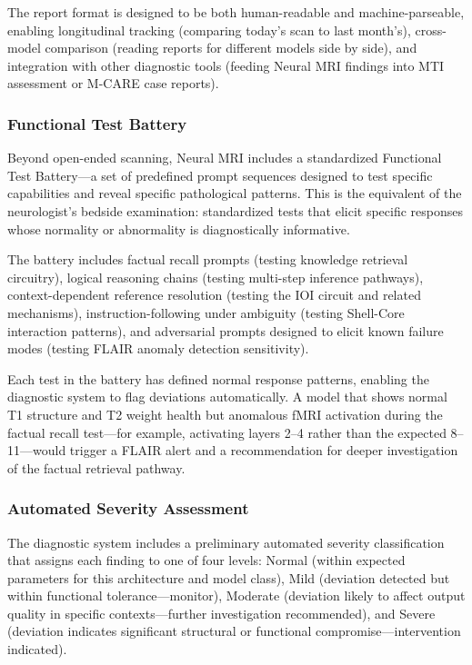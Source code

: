 \documentclass[11pt]{article}
\begin{document}
The report format is designed to be both human-readable and machine-parseable, enabling longitudinal tracking (comparing today's scan to last month's), cross-model comparison (reading reports for different models side by side), and integration with other diagnostic tools (feeding Neural MRI findings into MTI assessment or M-CARE case reports).

\subsubsection{Functional Test Battery}

Beyond open-ended scanning, Neural MRI includes a standardized Functional Test Battery---a set of predefined prompt sequences designed to test specific capabilities and reveal specific pathological patterns. This is the equivalent of the neurologist's bedside examination: standardized tests that elicit specific responses whose normality or abnormality is diagnostically informative.

The battery includes factual recall prompts (testing knowledge retrieval circuitry), logical reasoning chains (testing multi-step inference pathways), context-dependent reference resolution (testing the IOI circuit and related mechanisms), instruction-following under ambiguity (testing Shell-Core interaction patterns), and adversarial prompts designed to elicit known failure modes (testing FLAIR anomaly detection sensitivity).

Each test in the battery has defined normal response patterns, enabling the diagnostic system to flag deviations automatically. A model that shows normal T1 structure and T2 weight health but anomalous fMRI activation during the factual recall test---for example, activating layers 2--4 rather than the expected 8--11---would trigger a FLAIR alert and a recommendation for deeper investigation of the factual retrieval pathway.

\subsubsection{Automated Severity Assessment}

The diagnostic system includes a preliminary automated severity classification that assigns each finding to one of four levels: Normal (within expected parameters for this architecture and model class), Mild (deviation detected but within functional tolerance---monitor), Moderate (deviation likely to affect output quality in specific contexts---further investigation recommended), and Severe (deviation indicates significant structural or functional compromise---intervention indicated).
\end{document}
